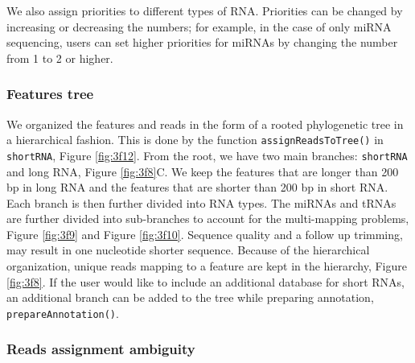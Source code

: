 \documentclass[12pt,twoside]{reedthesis}
\newenvironment{Shaded}{\begin{snugshade}}{\end{snugshade}}
\newcommand{\DecValTok}[1]{\textcolor[rgb]{0.00,0.00,0.81}{#1}}
\newcommand{\NormalTok}[1]{#1}
\newcommand{\SpecialCharTok}[1]{\textcolor[rgb]{0.00,0.00,0.00}{#1}}
\begin{document}
We also assign priorities to different types of RNA. Priorities can be
changed by increasing or decreasing the numbers; for example, in the
case of only miRNA sequencing, users can set higher priorities for
miRNAs by changing the number from 1 to 2 or higher.
\begin{Shaded}
\end{Shaded}
\hypertarget{ft}{%
\subsubsection{Features tree}\label{ft}}

We organized the features and reads in the form of a rooted phylogenetic
tree in a hierarchical fashion. This is done by the function
\texttt{assignReadsToTree()} in \texttt{shortRNA}, Figure \ref{fig:3f12}. From the root, we have two
main branches: \texttt{shortRNA} and long RNA, Figure \ref{fig:3f8}C. We keep the features
that are longer than 200 bp in long RNA and the features that are
shorter than 200 bp in short RNA. Each branch is then further divided
into RNA types. The miRNAs and tRNAs are further divided into
sub-branches to account for the multi-mapping problems, Figure \ref{fig:3f9} and
Figure \ref{fig:3f10}. Sequence quality and a follow up trimming, may result in one
nucleotide shorter sequence. Because of the hierarchical organization,
unique reads mapping to a feature are kept in the hierarchy, Figure \ref{fig:3f8}.
If the user would like to include an additional database for short RNAs,
an additional branch can be added to the tree while preparing
annotation, \texttt{prepareAnnotation()}.







\hypertarget{reads-assignment-ambiguity}{%
\subsubsection{Reads assignment ambiguity}\label{reads-assignment-ambiguity}}
\end{document}
